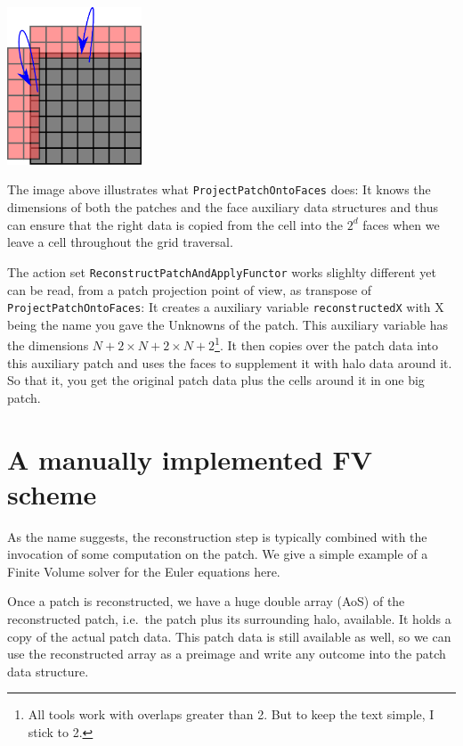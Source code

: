 \begin{center}
  \includegraphics[width=0.3\textwidth]{42_finite-volumes/ProjectPatchOntoFaces.pdf}
\end{center}


\noindent
The image above illustrates what \texttt{ProjectPatchOntoFaces} does:
It knows the dimensions of both the patches and the face auxiliary data
structures and thus can ensure that the right data is copied from the cell into
the $2^d$ faces when we leave a cell throughout the grid traversal.



The action set \texttt{ReconstructPatchAndApplyFunctor} works slighlty different
yet can be read, from a patch projection point of view, as transpose of
\texttt{ProjectPatchOntoFaces}:
It creates a auxiliary variable \texttt{reconstructedX} with X being the name
you gave the Unknowns of the patch.
This auxiliary variable has the dimensions 
$N+2 \times N+2 \times N+2$\footnote{All tools work with overlaps greater than
2. But to keep the text simple, I stick to 2.}.
It then copies over the patch data into this auxiliary patch and uses the faces
to supplement it with halo data around it.
So that it, you get the original patch data plus the cells around it in one big
patch.


\section{A manually implemented FV scheme}

As the name suggests, the reconstruction step is typically combined with the
invocation of some computation on the patch.
We give a simple example of a Finite Volume solver for the Euler equations here.


Once a patch is reconstructed, we have a huge double array (AoS) of the
reconstructed patch, i.e.~the patch plus its surrounding halo, available.
It holds a copy of the actual patch data.
This patch data is still available as well, so we can use the reconstructed
array as a preimage and write any outcome into the patch data structure.


